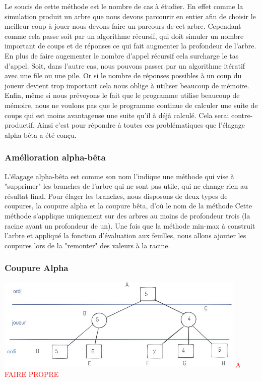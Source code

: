 \documentclass[a4paper, 12pt, french]{article}
\begin{document}
	Le soucis de cette méthode est le nombre de cas à étudier. En effet comme la simulation
	produit un arbre que nous devons parcourir en entier afin de choisir le meilleur coup à jouer
	nous devons faire un parcours de cet arbre. Cependant comme cela passe soit par un algorithme récursif,
	qui doit simuler un nombre important de coups et de réponses ce qui fait augmenter la profondeur de l'arbre.
	En plus de faire augementer le nombre d'appel récursif cela surcharge le tas d'appel. Soit, dans l'autre cas,
	nous pouvons passer par un algorithme itératif avec une file ou une pile. Or si le nombre de réponses possibles
	à un coup du joueur devient trop important cela nous oblige à utiliser beaucoup de mémoire. Enfin, même si nous
	prévoyons le fait que le programme utilise beaucoup de mémoire, nous ne voulons pas que le programme continue de
	calculer une suite de coups qui est moins avantageuse une suite qu'il à déjà calculé. Cela serai contre-productif.
	Ainsi c'est pour répondre à toutes ces problématiques que l'élagage alpha-bêta a été conçu.

	\subsubsection{Amélioration alpha-bêta}
	L'élagage alpha-bêta est comme son nom l'indique une méthode qui vise à "supprimer" les branches de l'arbre qui
	ne sont pas utile, qui ne change rien au résultat final. Pour élager les branches, nous disposons de deux types de
	coupures, la coupure alpha et la coupure bêta, d'où le nom de la méthode\cite{elagage_alpha_beta}
	Cette méthode s'applique uniquement sur des arbres au moins de profondeur trois
	(la racine ayant un profondeur de un). Une fois que la méthode min-max à construit l'arbre
	et appliqué la fonction d'évaluation aux feuilles, nous allons ajouter les coupures lors de la
	"remonter" des valeurs à la racine.

	\subsubsection{Coupure Alpha}
	\includegraphics[width=12cm]{images/elagageAlpha.JPG}
	\textcolor{red}{A FAIRE PROPRE}
\end{document}
